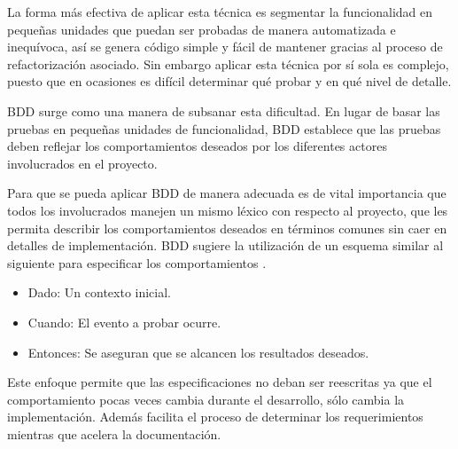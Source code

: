 La forma más efectiva de aplicar esta técnica es segmentar la funcionalidad en pequeñas unidades que puedan ser probadas de manera automatizada e inequívoca, así se genera código simple y fácil de mantener gracias al proceso de refactorización asociado. Sin embargo aplicar esta técnica por sí sola es complejo, puesto que en ocasiones es difícil determinar qué probar y en qué nivel de detalle.

BDD surge como una manera de subsanar esta dificultad. En lugar de basar las pruebas en pequeñas unidades de funcionalidad, BDD establece que las pruebas deben reflejar los comportamientos deseados por los diferentes actores involucrados en el proyecto. 

Para que se pueda aplicar BDD de manera adecuada es de vital importancia que todos los involucrados manejen un mismo léxico con respecto al proyecto, que les permita describir los comportamientos deseados en términos comunes sin caer en detalles de implementación. BDD sugiere la utilización de un esquema similar al siguiente para especificar los comportamientos \cite{IBDD}.

\begin{itemize}
\item Dado: Un contexto inicial.
\item Cuando: El evento a probar ocurre.
\item Entonces: Se aseguran que se alcancen los resultados deseados.
\end{itemize}

Este enfoque permite que las especificaciones no deban ser reescritas ya que el comportamiento pocas veces cambia durante el desarrollo, sólo cambia la implementación. Además facilita el proceso de determinar los requerimientos mientras que acelera la documentación.



 

